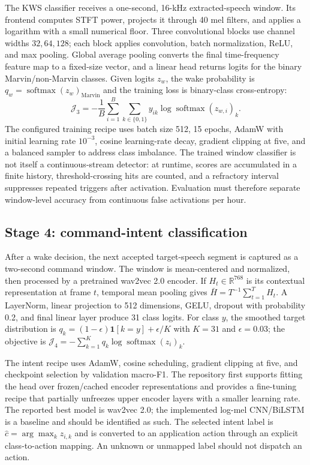 The KWS classifier receives a one-second, 16-kHz extracted-speech window. Its frontend computes STFT power, projects it through 40 mel filters, and applies a logarithm with a small numerical floor. Three convolutional blocks use channel widths $32,64,128$; each block applies convolution, batch normalization, ReLU, and max pooling. Global average pooling converts the final time-frequency feature map to a fixed-size vector, and a linear head returns logits for the binary Marvin/non-Marvin classes. Given logits $z_w$, the wake probability is $q_w=\operatorname{softmax}(z_w)_{\mathrm{Marvin}}$ and the training loss is binary-class cross-entropy:
\begin{equation}
  \mathcal{J}_3=-\frac{1}{B}\sum_{i=1}^{B}\sum_{k\in\{0,1\}}
       y_{ik}\log\operatorname{softmax}(z_{w,i})_k.
  \label{eq:method-stage3-loss}
\end{equation}
The configured training recipe uses batch size 512, 15 epochs, AdamW with initial learning rate $10^{-3}$, cosine learning-rate decay, gradient clipping at five, and a balanced sampler to address class imbalance. The trained window classifier is not itself a continuous-stream detector: at runtime, scores are accumulated in a finite history, threshold-crossing hits are counted, and a refractory interval suppresses repeated triggers after activation. Evaluation must therefore separate window-level accuracy from continuous false activations per hour.

\subsection{Stage 4: command-intent classification}
\label{subsec:method-stage4}

After a wake decision, the next accepted target-speech segment is captured as a two-second command window. The window is mean-centered and normalized, then processed by a pretrained wav2vec 2.0 encoder. If $H_t\in\mathbb{R}^{768}$ is its contextual representation at frame $t$, temporal mean pooling gives $\bar{H}=T^{-1}\sum_{t=1}^{T}H_t$. A LayerNorm, linear projection to 512 dimensions, GELU, dropout with probability 0.2, and final linear layer produce 31 class logits. For class $y$, the smoothed target distribution is $q_k=(1-\epsilon)\mathbf{1}[k=y]+\epsilon/K$ with $K=31$ and $\epsilon=0.03$; the objective is $\mathcal{J}_4=-\sum_{k=1}^{K}q_k\log\operatorname{softmax}(z_i)_k$.

The intent recipe uses AdamW, cosine scheduling, gradient clipping at five, and checkpoint selection by validation macro-F1. The repository first supports fitting the head over frozen/cached encoder representations and provides a fine-tuning recipe that partially unfreezes upper encoder layers with a smaller learning rate. The reported best model is wav2vec 2.0; the implemented log-mel CNN/BiLSTM is a baseline and should be identified as such. The selected intent label is $\hat{c}=\arg\max_k z_{i,k}$ and is converted to an application action through an explicit class-to-action mapping. An unknown or unmapped label should not dispatch an action.


